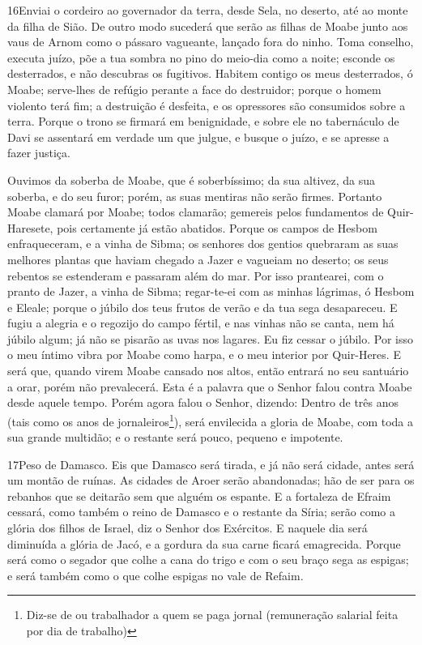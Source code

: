 \medskip

\lettrine{16}{}Enviai o cordeiro ao governador da terra, desde
Sela, no deserto, até ao monte da filha de Sião. De outro modo
sucederá que serão as filhas de Moabe junto aos vaus de Arnom como o
pássaro vagueante, lançado fora do ninho. Toma conselho, executa
juízo, põe a tua sombra no pino do meio-dia como a noite; esconde os
desterrados, e não descubras os fugitivos. Habitem contigo os
meus desterrados, ó Moabe; serve-lhes de refúgio perante a face do
destruidor; porque o homem violento terá fim; a destruição é
desfeita, e os opressores são consumidos sobre a terra. Porque o
trono se firmará em benignidade, e sobre ele no tabernáculo de Davi
se assentará em verdade um que julgue, e busque o juízo, e se
apresse a fazer justiça.

Ouvimos da soberba de Moabe, que é soberbíssimo; da sua altivez,
da sua soberba, e do seu furor; porém, as suas mentiras não serão
firmes. Portanto Moabe clamará por Moabe; todos clamarão;
gemereis pelos fundamentos de Quir-Haresete, pois certamente já
estão abatidos. Porque os campos de Hesbom enfraqueceram, e a
vinha de Sibma; os senhores dos gentios quebraram as suas melhores
plantas que haviam chegado a Jazer e vagueiam no deserto; os seus
rebentos se estenderam e passaram além do mar. Por isso
prantearei, com o pranto de Jazer, a vinha de Sibma; regar-te-ei com
as minhas lágrimas, ó Hesbom e Eleale; porque o júbilo dos teus
frutos de verão e da tua sega desapareceu. E fugiu a alegria
e o regozijo do campo fértil, e nas vinhas não se canta, nem há
júbilo algum; já não se pisarão as uvas nos lagares. Eu fiz cessar o
júbilo. Por isso o meu íntimo vibra por Moabe como harpa, e o
meu interior por Quir-Heres. E será que, quando virem Moabe
cansado nos altos, então entrará no seu santuário a orar, porém não
prevalecerá. Esta é a palavra que o Senhor falou contra Moabe
desde aquele tempo. Porém agora falou o Senhor, dizendo:
Dentro de três anos (tais como os anos de
jornaleiros\footnote{Diz-se de ou trabalhador a quem se paga jornal
(remuneração salarial feita por dia de trabalho)}), será envilecida
a gloria de Moabe, com toda a sua grande multidão; e o restante será
pouco, pequeno e impotente.

\medskip

\lettrine{17}{}Peso de Damasco. Eis que Damasco será tirada, e
já não será cidade, antes será um montão de ruínas. As cidades
de Aroer serão abandonadas; hão de ser para os rebanhos que se
deitarão sem que alguém os espante. E a fortaleza de Efraim
cessará, como também o reino de Damasco e o restante da Síria; serão
como a glória dos filhos de Israel, diz o Senhor dos Exércitos.
E naquele dia será diminuída a glória de Jacó, e a gordura da
sua carne ficará emagrecida. Porque será como o segador que
colhe a cana do trigo e com o seu braço sega as espigas; e será
também como o que colhe espigas no vale de Refaim.

